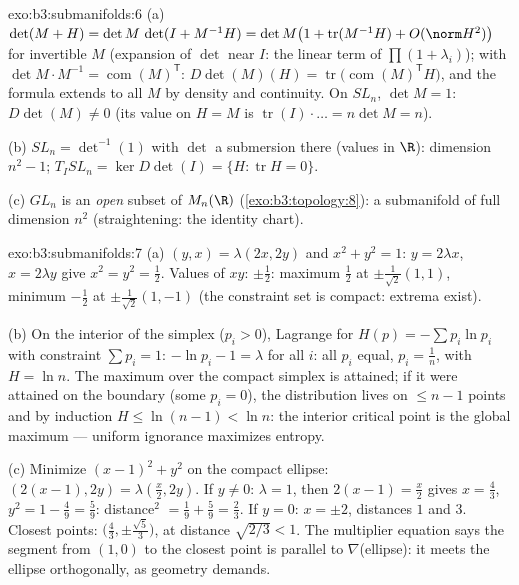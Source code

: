 \begin{solution}{exo:b3:submanifolds:6}
(a) $\det(M + H) = \det M\,\det(I + M^{-1}H) = \det M\bigl(1
+ \operatorname{tr}(M^{-1}H) + O(\norm H^2)\bigr)$ for
invertible $M$ (expansion of $\det$ near $I$: the linear term
of $\prod(1 + \lambda_i)$); with $\det M\cdot M^{-1} =
\operatorname{com}(M)^{\mathsf T}$:
$D\det(M)(H) = \operatorname{tr}\bigl(\operatorname{com}
(M)^{\mathsf T}H\bigr)$, and the formula extends to all $M$
by density and continuity. On $SL_n$, $\det M = 1$:
$D\det(M) \ne 0$ (its value on $H = M$ is
$\operatorname{tr}(I)\cdot\dots = n\det M = n$).

(b) $SL_n = \det^{-1}(1)$ with $\det$ a submersion there
(values in $\R$): dimension $n^2 - 1$; $T_ISL_n = \ker
D\det(I) = \{H : \operatorname{tr}H = 0\}$.

(c) $GL_n$ is an \emph{open} subset of $M_n(\R)$
(\cref{exo:b3:topology:8}): a submanifold of full dimension
$n^2$ (straightening: the identity chart).
\end{solution}

\begin{solution}{exo:b3:submanifolds:7}
(a) $(y, x) = \lambda(2x, 2y)$ and $x^2 + y^2 = 1$: $y =
2\lambda x$, $x = 2\lambda y$ give $x^2 = y^2 = \frac12$.
Values of $xy$: $\pm\frac12$: maximum $\frac12$ at
$\pm\frac1{\sqrt2}(1,1)$, minimum $-\frac12$ at
$\pm\frac1{\sqrt2}(1,-1)$ (the constraint set is compact:
extrema exist).

(b) On the interior of the simplex ($p_i > 0$), Lagrange for
$H(p) = -\sum p_i\ln p_i$ with constraint $\sum p_i = 1$:
$-\ln p_i - 1 = \lambda$ for all $i$: all $p_i$ equal, $p_i =
\frac1n$, with $H = \ln n$. The maximum over the compact
simplex is attained; if it were attained on the boundary
(some $p_i = 0$), the distribution lives on $\leq n - 1$
points and by induction $H \leq \ln(n-1) < \ln n$: the
interior critical point is the global maximum --- uniform
ignorance maximizes entropy.

(c) Minimize $(x-1)^2 + y^2$ on the compact ellipse:
$(2(x{-}1), 2y) = \lambda(\frac x2, 2y)$. If $y \neq 0$:
$\lambda = 1$, then $2(x - 1) = \frac x2$ gives $x =
\frac43$, $y^2 = 1 - \frac49 = \frac59$: distance$^2$ $=
\frac19 + \frac59 = \frac23$. If $y = 0$: $x = \pm2$,
distances $1$ and $3$. Closest points: $\bigl(\frac43,
\pm\frac{\sqrt5}3\bigr)$, at distance $\sqrt{2/3} < 1$. The
multiplier equation says the segment from $(1,0)$ to the
closest point is parallel to $\nabla$(ellipse): it meets the
ellipse orthogonally, as geometry demands.
\end{solution}


